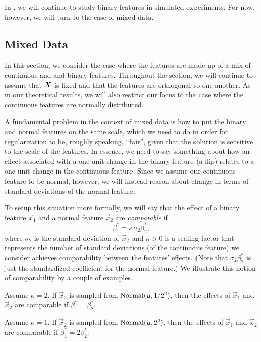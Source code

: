 In , we will continue to study binary features in simulated experiments. For now, however, we will turn to the case of mixed data.

\subsection{Mixed Data}\label{sec:mixed-data}

In this section, we consider the case where the features are made up of a mix of continuous and and binary features.
Throughout the section, we will continue to assume that \(\boldsymbol{X}\) is fixed and that the features are orthogonal to one another.
As in our theoretical results, we will also restrict our focus to the case where the continuous features are normally distributed.

A fundamental problem in the context of mixed data is how to put the binary and normal features on the same scale, which we need to do in order for regularization to be, roughly speaking, ``fair'', given that the solution is sensitive to the scale of the features.
In essence, we need to say something about how an effect associated with a one-unit change in the binary feature (a flip) relates to a one-unit change in the continuous feature.
Since we assume our continuous feature to be normal, however, we will instead reason about change in terms of standard deviations of the normal feature.

To setup this situation more formally, we will say that the effect of a binary feature \(\vec{x}_1\) and a normal feature \(\vec{x}_2\) are \emph{comparable} if
\[
  \beta^*_1 = \kappa \sigma_{2}\beta^*_2,
\]
where \(\sigma_2\) is the standard deviation of \(\vec{x}_2\) and \(\kappa > 0\) is a scaling factor that represents the number of standard deviations (of the continuous feature) we consider achieves comparability between the features' effects. (Note that \(\sigma_2 \beta_2^*\) is just the standardized coefficient for the normal feature.) We illustrate this notion of comparability by a couple of examples.

\begin{example}
  Assume \(\kappa = 2\). If \(\vec{x}_2\) is sampled from \(\operatorname{Normal}(\mu, 1/2^2)\), then the effects of \(\vec{x}_1\) and \(\vec{x}_2\) are comparable if \(\beta_1^* = \beta_2^*\).
\end{example}
\begin{example}
  Assume \(\kappa = 1\). If \(\vec{x}_2\) is sampled from \(\operatorname{Normal}(\mu, 2^2)\), then the effects of \(\vec{x}_1\) and \(\vec{x}_2\) are comparable if \(\beta_1^* = 2\beta_2^*\).
\end{example}

